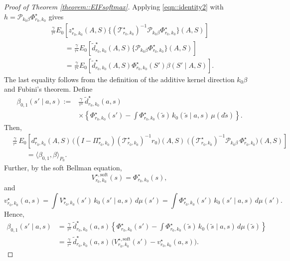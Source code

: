 \documentclass[11pt]{article}
\theoremstyle{plain}
\begin{document}
\begin{proof}[Proof of Theorem \ref{theorem::EIFsoftmax}]
Applying \eqref{eqn::identity2} with
\(h=\mathcal P_{k_0\beta}\Phi_{r_0,k_0}^\star\) gives
\begin{align*}
&\frac{\gamma}{\tau^\star}
E_0\!\left[z_{r_0,k_0}^\star(A,S)
\{(\mathcal T_{r_0,k_0}^\star)^{-1}
\mathcal P_{k_0\beta}\Phi_{r_0,k_0}^\star\}(A,S)\right] \\
&\qquad=\frac{\gamma}{\tau^\star}
E_0\!\left[\widetilde d_{r_0,k_0}^\star(A,S)
\{\mathcal P_{k_0\beta}\Phi_{r_0,k_0}^\star\}(A,S)\right] \\
&\qquad=\frac{\gamma}{\tau^\star}
E_0\!\left[\widetilde d_{r_0,k_0}^\star(A,S)
\Phi_{r_0,k_0}^\star(S')\beta(S'\mid A,S)\right].
\end{align*}
The last equality follows from the definition of the additive kernel
direction \(k_0\beta\) and Fubini's theorem.
Define 
\[
\begin{aligned}
\beta_{0,1}(s' \mid a, s)
:={}& \tfrac{\gamma}{\tau^\star}\,\widetilde{d}_{r_0,k_0}^\star(a,s) \\
&\times \left\{\Phi_{r_0,k_0}^\star(s')
- \int \Phi_{r_0,k_0}^\star(\tilde s)\,k_0(\tilde s \mid a, s)\,\mu(d\tilde s)\right\}.
\end{aligned}
\]
Then,
\[
\begin{aligned}
&\tfrac{\gamma}{\tau^\star}\,
E_0\!\left[d_{r_0,k_0}^{\star}(A,S)\,
\big((I-\Pi_{r_0,k_0}^\star)(\mathcal{T}_{r_0,k_0}^\star)^{-1} r_0\big)(A,S)\;
\big((\mathcal{T}_{r_0,k_0}^\star)^{-1}\mathcal{P}_{k_0\beta}\,\Phi_{r_0,k_0}^\star\big)(A,S)
\right] \\
&\qquad=  \langle \beta_{0,1}, \beta \rangle_{P_0}.
\end{aligned}
\]
Further, by the soft Bellman equation,
\[
V_{r_0,k_0}^{\star,\mathrm{soft}}(s)=\Phi_{r_0,k_0}^\star(s),
\]
and
\[
v_{r_0,k_0}^\star(a,s)
=\int V_{r_0,k_0}^\star(s')\,k_0(s'\mid a,s)\,d\mu(s')
=\int \Phi_{r_0,k_0}^\star(s')\,k_0(s'\mid a,s)\,d\mu(s').
\]
Hence,
\[
\begin{aligned}
\beta_{0,1}(s'\mid a,s)
&=\frac{\gamma}{\tau^\star}\,\widetilde{d}_{r_0,k_0}^\star(a,s)\left\{
\Phi_{r_0,k_0}^\star(s')
-\int \Phi_{r_0,k_0}^\star(\tilde s)\,k_0(\tilde s\mid a,s)\,d\mu(\tilde s)
\right\}\\
&=\frac{\gamma}{\tau^\star}\,\widetilde{d}_{r_0,k_0}^\star(a,s)\,
\Big(V_{r_0,k_0}^{\star,\mathrm{soft}}(s')-v_{r_0,k_0}^\star(a,s)\Big).
\end{aligned}
\]
 





\end{proof}
\end{document}
